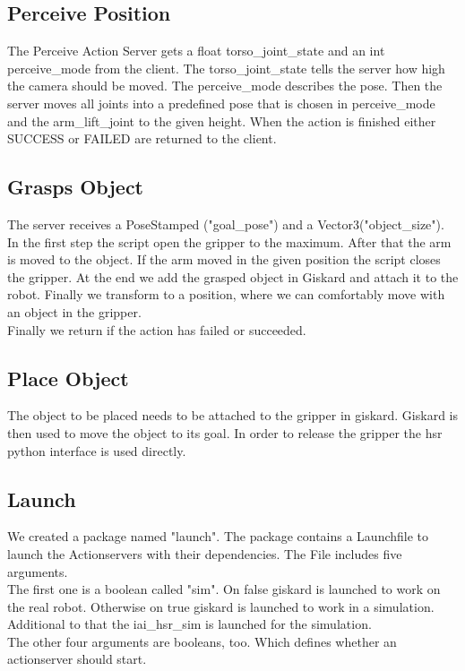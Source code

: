 \documentclass[main.tex]{subfiles}
\begin{document}
	\subsection{Perceive Position}
	The Perceive Action Server gets a float torso\_joint\_state and an int perceive\_mode from the client. The torso\_joint\_state tells the server how high the camera should be moved. The perceive\_mode describes the pose. Then the server moves all joints into a predefined pose that is chosen in perceive\_mode and the arm\_lift\_joint to the given height. When the action is finished either SUCCESS or FAILED are returned to the client.

	\vspace{1cm}
	
	\subsection{Grasps Object}
	The server receives a PoseStamped ("goal\_pose") and a Vector3("object\_size"). In the first step the script open the gripper to the maximum. After that the arm is moved to the object. If the arm moved in the given position the script closes the gripper. At the end we add the grasped object in Giskard and attach it to the robot. Finally we transform to a position, where we can comfortably move with an object in the gripper.\\
	Finally we return if the action has failed or succeeded.
	
	
	\vspace{1cm}
	
	\subsection{Place Object}
	The object to be placed needs to be attached to the gripper in giskard. Giskard is then used to move the object to its goal. In order to release the gripper the hsr python interface is used directly.
	\vspace{1cm}
	
	\subsection{Launch}
	We created a package named "launch". The package contains a Launchfile to launch the Actionservers with their dependencies. The File includes five arguments.\\
	The first one is a boolean called "sim". On false giskard is launched to work on the real robot. Otherwise on true giskard is launched to work in a simulation. Additional to that the iai\_hsr\_sim is launched for the simulation.\\
	The other four arguments are booleans, too. Which defines whether an actionserver should start. 
\end{document}
